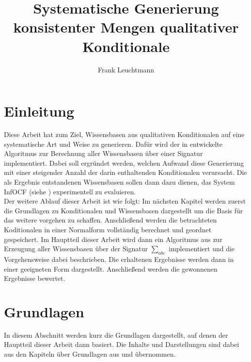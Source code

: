 \documentclass[12pt,a4paper]{article}
\author{Frank Leuchtmann}
\title{Systematische Generierung konsistenter Mengen qualitativer
Konditionale}
\begin{document}
\maketitle
\newpage
\tableofcontents
\newpage
\section{Einleitung}
Diese Arbeit hat zum Ziel, Wissensbasen aus qualitativen Konditionalen auf eine systematische Art und Weise zu generieren. Dafür wird der in \cite{beierle19} entwickelte Algoritmus zur Berechnung aller Wissensbasen über einer Signatur implementiert. Dabei soll ergründet werden, welchen Aufwand diese Generierung mit einer steigender Anzahl der darin  enthaltenden Konditionalen verursacht. Die als Ergebnis entstandenen Wissensbasen sollen dann dazu dienen, das System InfOCF (siehe \cite{beierle17}) experimentell zu evaluieren.
\\
Der weitere Ablauf dieser Arbeit ist wie folgt: Im nächsten Kapitel werden zuerst die Grundlagen zu Konditionalen und Wissensbasen dargestellt um die Basis für das weitere vorgehen zu schaffen. Anschließend werden die betrachteten Koditionalen in einer Normalform vollständig berechnet und geordnet gespeichert. Im Hauptteil dieser Arbeit wird dann ein Algoritmus aus \cite{beierle19} zur Erzeugung aller Wissensbasen über der Signatur $\sum_{abc}$ implementiert und die Vorgehensweise dabei beschrieben. Die erhaltenen Ergebnisse werden dann in einer geeigneten Form dargestellt. Anschließend werden die gewonnenen Ergebnisse bewertet.
\section{Grundlagen}
In diesem Abschnitt werden kurz die Grundlagen dargestellt, auf denen der Hauptteil dieser Arbeit dann basiert. Die Inhalte und Darstellungen sind dabei aus den Kapiteln über Grundlagen aus \cite{beierle19} und \cite{beierle17} übernommen.
\end{document}
